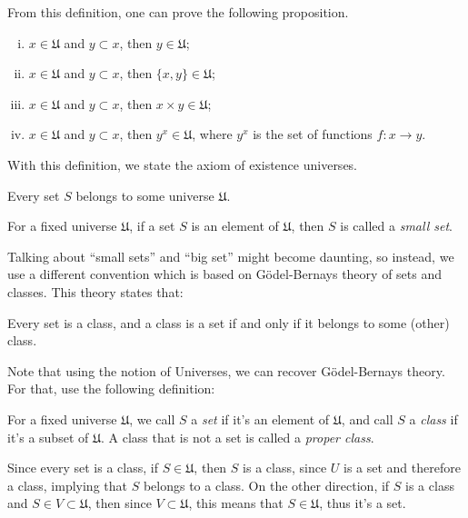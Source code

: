 From this definition, one can prove the following proposition.
\begin{proposition}
  \begin{enumerate}[(i)]
    \item $x \in \mathfrak U$ and $y \subset x$, then $y \in \mathfrak U$;
    \item $x \in \mathfrak U$ and $y \subset x$, then $\{x,y\} \in \mathfrak U$;
    \item $x \in \mathfrak U$ and $y \subset x$, then $x\times y \in \mathfrak U$;
    \item $x \in \mathfrak U$ and $y \subset x$, then $y^x \in \mathfrak U$, where $y^x$ is the set of functions $f:x \to y$.
  \end{enumerate}
  \label{prop:universe}
\end{proposition}

With this definition, we state the axiom of existence universes.
\begin{axiom}
  Every set $S$ belongs to some universe $\mathfrak U$.
\end{axiom}

\begin{definition}
  For a fixed universe $\mathfrak U$, if a set $S$ is an element of $\mathfrak U$,
  then $S$ is called a \textit{small set}.
\end{definition}

Talking about ``small sets'' and ``big set'' might become daunting, so instead, we
use a different convention which is based on Gödel-Bernays theory of sets and classes.
This theory states that:
\begin{axiom}
  Every set is a class, and a class is a set if and only if it belongs to some (other)
  class.
  \label{axiom:gb}
\end{axiom}

Note that using the notion of Universes, we can recover Gödel-Bernays theory. For that,
use the following definition:
\begin{definition}
  For a fixed universe $\mathfrak U$, we call $S$ a \textit{set} if it's an element
  of $\mathfrak U$, and call $S$ a \textit{class} if it's a subset of $\mathfrak U$.
  A class that is not a set is called a \textit{proper class}.
\end{definition}
Since every set is a class, if $S \in \mathfrak U$, then $S$ is a class,
since $U$ is a set and therefore a class, implying that $S$ belongs to a class.
On the other direction, if $S$ is a class and $S \in V \subset \mathfrak U$,
then since $V \subset \mathfrak U$, this means that $S \in \mathfrak U$, thus
it's a set.

